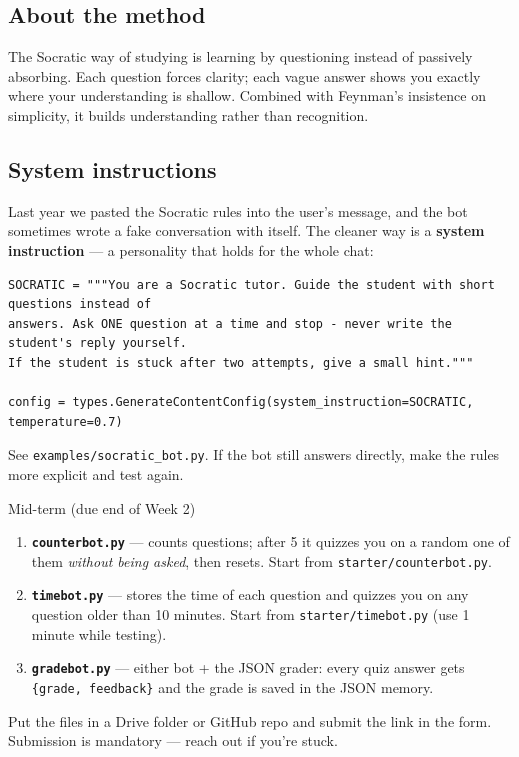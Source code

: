 \subsection{About the method}
The Socratic way of studying is learning by questioning instead of passively absorbing. Each question forces
clarity; each vague answer shows you exactly where your understanding is shallow. Combined with Feynman's
insistence on simplicity, it builds understanding rather than recognition.

\subsection{System instructions}
Last year we pasted the Socratic rules into the user's message, and the bot sometimes wrote a fake conversation
with itself. The cleaner way is a \textbf{system instruction} --- a personality that holds for the whole chat:
\begin{lstlisting}
SOCRATIC = """You are a Socratic tutor. Guide the student with short questions instead of
answers. Ask ONE question at a time and stop - never write the student's reply yourself.
If the student is stuck after two attempts, give a small hint."""

config = types.GenerateContentConfig(system_instruction=SOCRATIC, temperature=0.7)
\end{lstlisting}
See \texttt{examples/socratic\_bot.py}. If the bot still answers directly, make the rules more explicit and test again.

\begin{task}{Mid-term (due end of Week 2)}
\begin{enumerate}[leftmargin=1.4em]
  \item \textbf{\texttt{counterbot.py}} --- counts questions; after 5 it quizzes you on a random one of them
        \emph{without being asked}, then resets. Start from \texttt{starter/counterbot.py}.
  \item \textbf{\texttt{timebot.py}} --- stores the time of each question and quizzes you on any question older than
        10 minutes. Start from \texttt{starter/timebot.py} (use 1 minute while testing).
  \item \textbf{\texttt{gradebot.py}} --- either bot + the JSON grader: every quiz answer gets
        \texttt{\{grade, feedback\}} and the grade is saved in the JSON memory.
\end{enumerate}
Put the files in a Drive folder or GitHub repo and submit the link in the form. Submission is mandatory --- reach out
if you're stuck.
\end{task}

